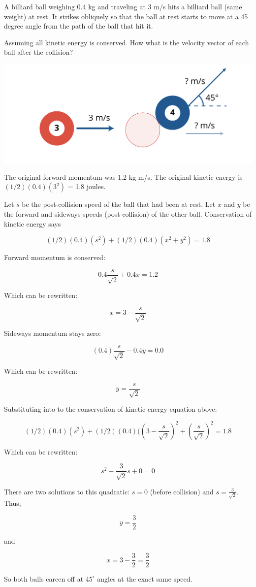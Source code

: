 \begin{Exercise}[title={Billiard Balls}, label=billiards]
  
A billiard ball weighing 0.4 kg and traveling at 3 m/s hits a billiard
ball (same weight) at rest. It strikes obliquely so that the ball at rest starts to
move at a 45 degree angle from the path of the ball that hit it.

Assuming all kinetic energy is conserved. How what is the velocity
vector of each ball after the collision?

\includegraphics[width=1\textwidth]{poolball.png}

\end{Exercise}
\begin{Answer}[ref=billiards]

  The original forward momentum was 1.2 kg m/s.  The original kinetic energy is $(1/2)(0.4)(3^2)$ = 1.8 joules. 

  Let $s$ be the post-collision speed of the ball that had been at
  rest.  Let $x$ and $y$ be the forward and sideways speeds
  (post-collision) of the other ball. Conservation of kinetic energy says

  $$(1/2)(0.4)(s^2) + (1/2)(0.4)(x^2+y^2) = 1.8$$

  Forward momentum is conserved:

  $$0.4\frac{s}{\sqrt{2}} + 0.4 x = 1.2$$

  Which can be rewritten:

  $$x = 3 - \frac{s}{\sqrt{2}}$$
  
  Sideways momentum stays zero:

  $$(0.4)\frac{s}{\sqrt{2}} - 0.4 y = 0.0$$

  Which can be rewritten:

  $$y = \frac{s}{\sqrt{2}}$$

  Substituting into to the conservation of kinetic energy equation above:

  $$(1/2)(0.4)(s^2) + (1/2)(0.4)(\left(3 - \frac{s}{\sqrt{2}}\right)^2+\left(\frac{s}{\sqrt{2}}\right)^2 = 1.8$$

  Which can be rewritten:

  $$s^2 - \frac{3}{\sqrt{2}} s + 0 = 0$$

  There are two solutions to this quadratic: $s = 0$ (before collision) and $s = \frac{3}{\sqrt{2}}$. Thus,

  $$y = \frac{3}{2}$$

  and

  $$x = 3 - \frac{3}{2} = \frac{3}{2}$$

  So both balls careen off at $45^\circ$ angles at the exact same speed. 

  
\end{Answer}



